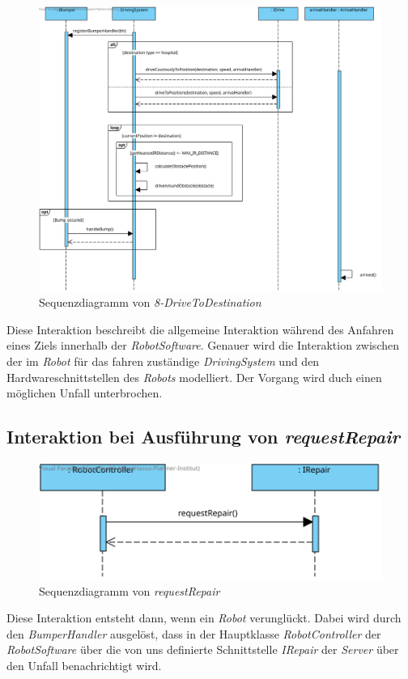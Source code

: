 \begin{figure}[H]
	\centering
	\includegraphics[width=1\textwidth]{img/8-driveToDestination}
	\caption{Sequenzdiagramm von \emph{8-DriveToDestination}}
	\label{driveToDestinationInteraktion}
\end{figure}
Diese Interaktion beschreibt die allgemeine Interaktion während des Anfahren eines Ziels innerhalb der \textit{RobotSoftware}. Genauer wird die Interaktion zwischen der im \textit{Robot} für das fahren zuständige \textit{DrivingSystem} und den Hardwareschnittstellen des \textit{Robots} modelliert. Der Vorgang wird duch einen möglichen Unfall unterbrochen.
\\

	
\subsection*{Interaktion bei Ausführung von \textit{requestRepair}}

\begin{figure}[H]
	\centering
	\includegraphics[width=1\textwidth]{img/8-requestRepair}
	\caption{Sequenzdiagramm von \emph{requestRepair}}
	\label{requestRepairInteraktion}
\end{figure}

Diese Interaktion entsteht dann, wenn ein \textit{Robot} verunglückt. Dabei wird durch den \textit{BumperHandler} ausgelöst, dass in der Hauptklasse \textit{RobotController} der \textit{RobotSoftware} über die von uns definierte Schnittstelle \textit{IRepair} der \textit{Server} über den Unfall benachrichtigt wird.\\

